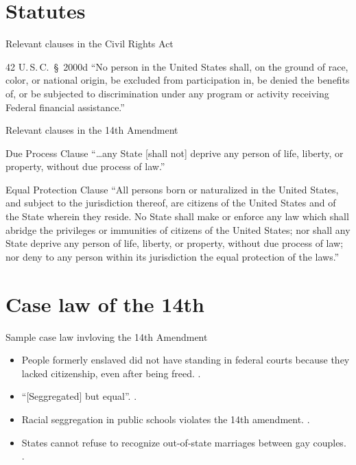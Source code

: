 \documentclass[ignorenonframetext, aspectratio=169]{beamer}
\begin{document}
\section{Statutes}

\begin{frame}{Relevant clauses in the Civil Rights Act}
\begin{block}{42 U.\,S.\,C.\ \S\ 2000d}
	``No person in the United States shall, on the ground of race, color, or national origin, be excluded from participation in, be denied the benefits of, or be subjected to discrimination under any program or activity receiving Federal financial assistance.''
\end{block}
\end{frame}

\begin{frame}{Relevant clauses in the 14th Amendment}
\begin{block}{Due Process Clause}
	``\ldots any State [shall not] deprive any person of life, liberty, or property, without due process of law.''
\end{block}
\begin{block}{Equal Protection Clause}
	``All persons born or naturalized in the United States, and subject to the jurisdiction thereof, are citizens of the United States and of the State wherein they reside. No State shall make or enforce any law which shall abridge the privileges or immunities of citizens of the United States; nor shall any State deprive any person of life, liberty, or property, without due process of law; nor deny to any person within its jurisdiction the equal protection of the laws.''
\end{block}
\end{frame}

\section{Case law of the 14th}

\begin{frame}{Sample case law invloving the 14th Amendment}
	\begin{itemize}
		\item People formerly enslaved did not have standing in federal courts because they lacked citizenship, even after being freed. .
		\item ``[Seggregated] but equal''. .
		\item Racial seggregation in public schools violates the 14th amendment. .
		\item States cannot refuse to recognize out-of-state marriages between gay couples. .
	\end{itemize}
\end{frame}
\end{document}
